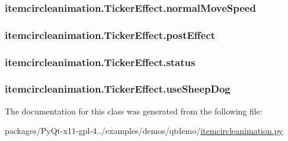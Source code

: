 \subsubsection[{normal\+Move\+Speed}]{\setlength{\rightskip}{0pt plus 5cm}itemcircleanimation.\+Ticker\+Effect.\+normal\+Move\+Speed}\label{classitemcircleanimation_1_1TickerEffect_afb3602b15bb5f3571b65edf5c2551511}
\hypertarget{classitemcircleanimation_1_1TickerEffect_a69610657acdb9862966b8020c387c5c9}{}
\subsubsection[{post\+Effect}]{\setlength{\rightskip}{0pt plus 5cm}itemcircleanimation.\+Ticker\+Effect.\+post\+Effect}\label{classitemcircleanimation_1_1TickerEffect_a69610657acdb9862966b8020c387c5c9}
\hypertarget{classitemcircleanimation_1_1TickerEffect_a0b0ebed8a272c5f02e72b77f6496aff8}{}
\subsubsection[{status}]{\setlength{\rightskip}{0pt plus 5cm}itemcircleanimation.\+Ticker\+Effect.\+status}\label{classitemcircleanimation_1_1TickerEffect_a0b0ebed8a272c5f02e72b77f6496aff8}
\hypertarget{classitemcircleanimation_1_1TickerEffect_a50cdc00ef027ddddc6409f231a58cf60}{}
\subsubsection[{use\+Sheep\+Dog}]{\setlength{\rightskip}{0pt plus 5cm}itemcircleanimation.\+Ticker\+Effect.\+use\+Sheep\+Dog}\label{classitemcircleanimation_1_1TickerEffect_a50cdc00ef027ddddc6409f231a58cf60}


The documentation for this class was generated from the following file\+:\begin{DoxyCompactItemize}
\item 
packages/\+Py\+Qt-\/x11-\/gpl-\/4../examples/demos/qtdemo/\hyperlink{itemcircleanimation_8py}{itemcircleanimation.\+py}\end{DoxyCompactItemize}
